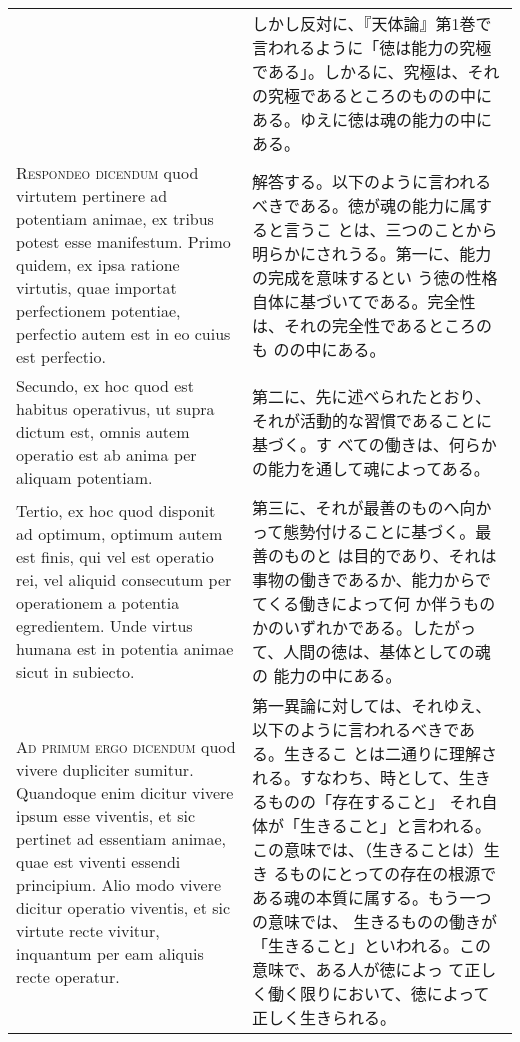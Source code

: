 \documentclass[10pt]{jsarticle}
\begin{document}
\begin{longtable}{p{21em}p{21em}}
&

しかし反対に、『天体論』第1巻で言われるように「徳は能力の究極である」。しかるに、究極は、それの究極であるところのものの中にある。ゆえに徳は魂の能力の中にある。

\\

{\scshape Respondeo dicendum} quod virtutem pertinere ad potentiam
animae, ex tribus potest esse manifestum. Primo quidem, ex ipsa
ratione virtutis, quae importat perfectionem potentiae, perfectio
autem est in eo cuius est perfectio.

&

解答する。以下のように言われるべきである。徳が魂の能力に属すると言うこ
とは、三つのことから明らかにされうる。第一に、能力の完成を意味するとい
う徳の性格自体に基づいてである。完全性は、それの完全性であるところのも
のの中にある。

\\

Secundo, ex hoc quod est habitus operativus, ut supra dictum est,
omnis autem operatio est ab anima per aliquam potentiam.

&

第二に、先に述べられたとおり、それが活動的な習慣であることに基づく。す
べての働きは、何らかの能力を通して魂によってある。

\\

Tertio, ex hoc quod disponit ad optimum, optimum autem est finis, qui
vel est operatio rei, vel aliquid consecutum per operationem a
potentia egredientem. Unde virtus humana est in potentia animae sicut
in subiecto.

&

第三に、それが最善のものへ向かって態勢付けることに基づく。最善のものと
は目的であり、それは事物の働きであるか、能力からでてくる働きによって何
か伴うものかのいずれかである。したがって、人間の徳は、基体としての魂の
能力の中にある。

\\



{\scshape Ad primum ergo dicendum} quod vivere dupliciter
sumitur. Quandoque enim dicitur vivere ipsum esse viventis, et sic
pertinet ad essentiam animae, quae est viventi essendi
principium. Alio modo vivere dicitur operatio viventis, et sic virtute
recte vivitur, inquantum per eam aliquis recte operatur.

&

第一異論に対しては、それゆえ、以下のように言われるべきである。生きるこ
とは二通りに理解される。すなわち、時として、生きるものの「存在すること」
それ自体が「生きること」と言われる。この意味では、（生きることは）生き
るものにとっての存在の根源である魂の本質に属する。もう一つの意味では、
生きるものの働きが「生きること」といわれる。この意味で、ある人が徳によっ
て正しく働く限りにおいて、徳によって正しく生きられる。


\end{longtable}
\end{document}

